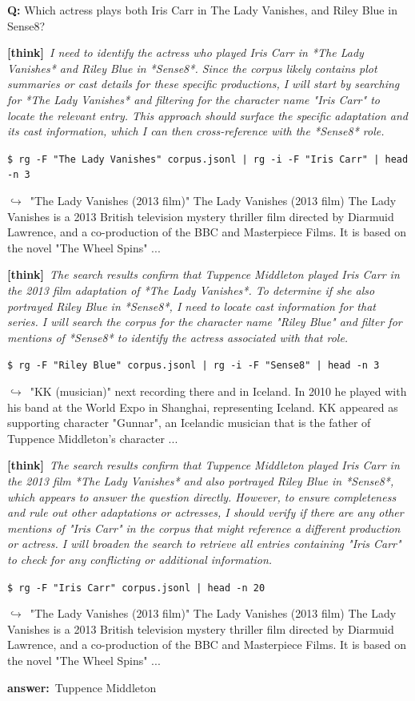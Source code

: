 \documentclass{article} %
\newcommand{\thk}[1]{{\footnotesize\textcolor{violet!75!black}{\textbf{[think]}}\ \textit{#1}\par}}
\newcommand{\cmd}[1]{{\footnotesize\texttt{\textcolor{blue!35!black}{\$\ #1}}\par}}
\newcommand{\retr}[1]{{\footnotesize\textcolor{black!65}{\quad$\hookrightarrow$\ #1}\par}}
\newcommand{\ans}[1]{{\footnotesize\textbf{answer:}\ #1\par}}
\begin{document}
\begin{sftbox}[label={ex:sft-actress},title={\textsc{two-role bridge (3 hops)}}]
\textbf{Q:} Which actress plays both Iris Carr in The Lady Vanishes, and Riley Blue in Sense8?\\[1pt]
  \thk{I need to identify the actress who played Iris Carr in *The Lady Vanishes* and Riley Blue in *Sense8*. Since the corpus likely contains plot summaries or cast details for these specific productions, I will start by searching for *The Lady Vanishes* and filtering for the character name "Iris Carr" to locate the relevant entry. This approach should surface the specific adaptation and its cast information, which I can then cross-reference with the *Sense8* role.}
  \cmd{rg -F "The Lady Vanishes" corpus.jsonl | rg -i -F "Iris Carr" | head -n 3}
  \retr{"The Lady Vanishes (2013 film)" The Lady Vanishes (2013 film) The Lady Vanishes is a 2013 British television mystery thriller film directed by Diarmuid Lawrence, and a co-production of the BBC and Masterpiece Films. It is based on the novel "The Wheel Spins" ...}
  \thk{The search results confirm that Tuppence Middleton played Iris Carr in the 2013 film adaptation of *The Lady Vanishes*. To determine if she also portrayed Riley Blue in *Sense8*, I need to locate cast information for that series. I will search the corpus for the character name "Riley Blue" and filter for mentions of *Sense8* to identify the actress associated with that role.}
  \cmd{rg -F "Riley Blue" corpus.jsonl | rg -i -F "Sense8" | head -n 3}
  \retr{"KK (musician)" next recording there and in Iceland. In 2010 he played with his band at the World Expo in Shanghai, representing Iceland. KK appeared as supporting character "Gunnar", an Icelandic musician that is the father of Tuppence Middleton's character ...}
  \thk{The search results confirm that Tuppence Middleton played Iris Carr in the 2013 film *The Lady Vanishes* and also portrayed Riley Blue in *Sense8*, which appears to answer the question directly. However, to ensure completeness and rule out other adaptations or actresses, I should verify if there are any other mentions of "Iris Carr" in the corpus that might reference a different production or actress. I will broaden the search to retrieve all entries containing "Iris Carr" to check for any conflicting or additional information.}
  \cmd{rg -F "Iris Carr" corpus.jsonl | head -n 20}
  \retr{"The Lady Vanishes (2013 film)" The Lady Vanishes (2013 film) The Lady Vanishes is a 2013 British television mystery thriller film directed by Diarmuid Lawrence, and a co-production of the BBC and Masterpiece Films. It is based on the novel "The Wheel Spins" ...}
  \ans{Tuppence Middleton}
\end{sftbox}\medskip
\end{document}
